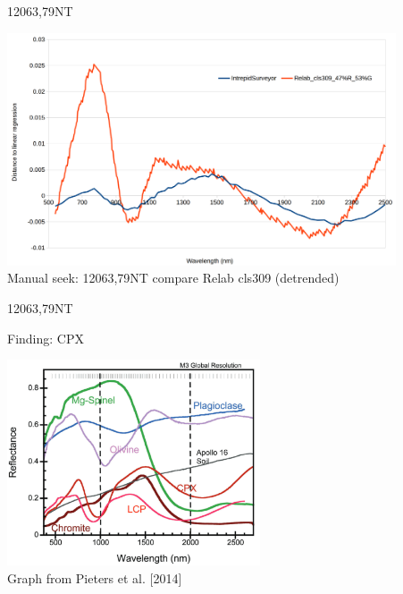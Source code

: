 \documentclass[aspectratio=169,unknownkeysallowed,xcolor=dvipsnames,beamer]{beamer} %
\begin{document}
\begin{frame}[fragile]{12063,79NT}
\begin{center}
  \includegraphics[width=11.5cm]{images/fig10}\\
  Manual seek: 12063,79NT compare Relab cls309 (detrended)
  \end{center}
\end{frame}

\begin{frame}[fragile]{12063,79NT}
\begin{block}{Finding: CPX}
\begin{center}
\includegraphics[width=7.5cm]{images/fig11}\\
Graph from Pieters et al. [2014]
\end{center}
\end{block}
\end{frame}
\end{document}
